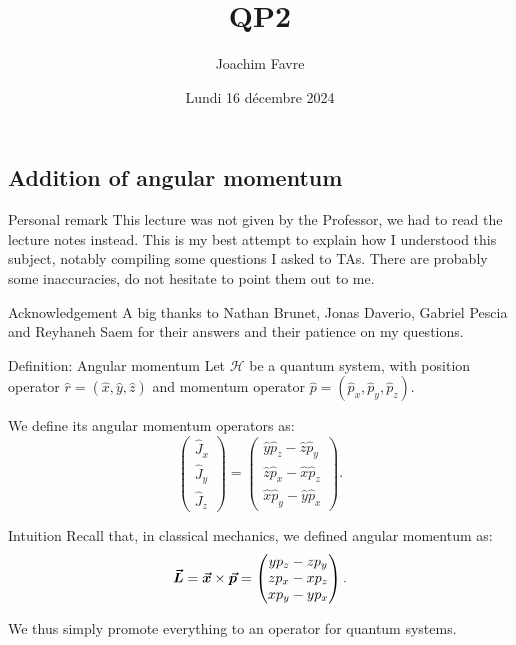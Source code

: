 \documentclass[a4paper]{article}
\title{QP2}
\author{Joachim Favre}
\date{Lundi 16 décembre 2024}
\begin{document}
\maketitle


\subsection{Addition of angular momentum}

\begin{parag}{Personal remark}
    This lecture was not given by the Professor, we had to read the lecture notes instead. This is my best attempt to explain how I understood this subject, notably compiling some questions I asked to TAs. There are probably some inaccuracies, do not hesitate to point them out to me.

    \begin{subparag}{Acknowledgement}
        A big thanks to Nathan Brunet, Jonas Daverio, Gabriel Pescia and Reyhaneh Saem for their answers and their patience on my questions.
    \end{subparag}
\end{parag}

\begin{parag}{Definition: Angular momentum}
    Let $\mathcal{H}$ be a quantum system, with position operator $\hat{r} = \left(\hat{x}, \hat{y}, \hat{z}\right)$ and momentum operator $\hat{p} = \left(\hat{p}_x, \hat{p}_y, \hat{p}_z\right)$.

    We define its angular momentum operators as:
    \[\begin{pmatrix} \hat{J}_x \\ \hat{J}_y \\ \hat{J}_z \end{pmatrix} = \begin{pmatrix} \hat{y} \hat{p}_z - \hat{z} \hat{p}_y \\ \hat{z} \hat{p}_x - \hat{x} \hat{p}_z \\ \hat{x} \hat{p}_y - \hat{y} \hat{p}_x \end{pmatrix}.\]

    \begin{subparag}{Intuition}
        Recall that, in classical mechanics, we defined angular momentum as:
        \[\bm{\protect\vec{L}} = \bm{\protect\vec{x}} \times \bm{\protect\vec{p}} = \begin{pmatrix} y p_z - z p_y \\ z p_x - x p_z \\ x p_y - y p_x\end{pmatrix}.\]

        We thus simply promote everything to an operator for quantum systems.
    \end{subparag}
\end{parag}
\end{document}
